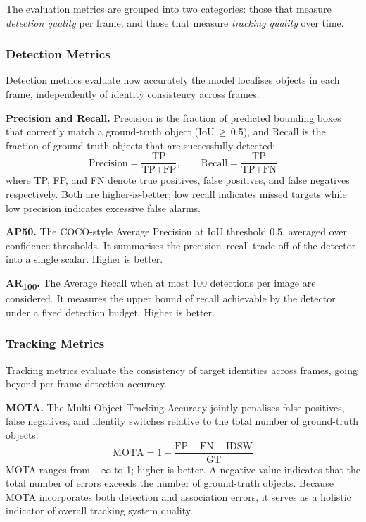 \documentclass[11pt]{article}
\begin{document}

The evaluation metrics are grouped into two categories: those that measure \emph{detection quality} per frame, and those that measure \emph{tracking quality} over time.

\subsubsection*{Detection Metrics}

Detection metrics evaluate how accurately the model localises objects in each frame, independently of identity consistency across frames.

\textbf{Precision and Recall.} Precision is the fraction of predicted bounding boxes that correctly match a ground-truth object (IoU\,$\geq$\,0.5), and Recall is the fraction of ground-truth objects that are successfully detected:
\[
  \text{Precision} = \frac{\text{TP}}{\text{TP} + \text{FP}}, \qquad
  \text{Recall} = \frac{\text{TP}}{\text{TP} + \text{FN}}
\]
where TP, FP, and FN denote true positives, false positives, and false negatives respectively. Both are higher-is-better; low recall indicates missed targets while low precision indicates excessive false alarms.

\textbf{AP50.} The COCO-style Average Precision at IoU threshold 0.5, averaged over confidence thresholds. It summarises the precision--recall trade-off of the detector into a single scalar. Higher is better.

\textbf{AR\textsubscript{100}.} The Average Recall when at most 100 detections per image are considered. It measures the upper bound of recall achievable by the detector under a fixed detection budget. Higher is better.

\subsubsection*{Tracking Metrics}

Tracking metrics evaluate the consistency of target identities across frames, going beyond per-frame detection accuracy.

\textbf{MOTA.} The Multi-Object Tracking Accuracy jointly penalises false positives, false negatives, and identity switches relative to the total number of ground-truth objects:
\[
  \text{MOTA} = 1 - \frac{\text{FP} + \text{FN} + \text{IDSW}}{\text{GT}}
\]
MOTA ranges from $-\infty$ to 1; higher is better. A negative value indicates that the total number of errors exceeds the number of ground-truth objects. Because MOTA incorporates both detection and association errors, it serves as a holistic indicator of overall tracking system quality.
\end{document}
